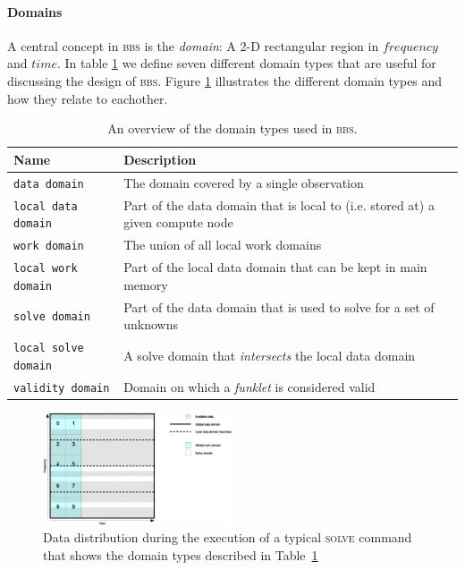 \documentclass[10pt]{lofar}
\newcommand{\bbs}{\textsc{bbs}\xspace}
\begin{document}
\paragraph{Domains}
A central concept in \bbs is the \emph{domain}: A 2-D rectangular region in
$frequency$ and $time$. In table \ref{tab:domains} we define seven different
domain types that are useful for discussing the design of \bbs. Figure
\ref{fig:domains} illustrates the different domain types and how they relate to
eachother.

\begin{table}[htb!]
\centering
\begin{tabular}{lp{}}
\hline
\textbf{Name} & \textbf{Description}\\
\hline
\texttt{data domain} & The domain covered by a single observation\\
\hline
\texttt{local data domain} & Part of the data domain that is local to (i.e.
stored at) a given compute node\\
\hline
\texttt{work domain} & The union of all local work domains\\
\hline
\texttt{local work domain} & Part of the local data domain that can be kept in
main memory\\
\hline
\texttt{solve domain} & Part of the data domain that is used to solve for a set
of unknowns\\
\hline
\texttt{local solve domain} & A solve domain that \emph{intersects} the local
data domain\\
\hline
\texttt{validity domain} & Domain on which a \emph{funklet} is considered
valid\\
\end{tabular}
\caption{An overview of the domain types used in \bbs.}
\label{tab:domains}
\end{table}

\begin{figure}[htbp]
\centering
\includegraphics[width=0.5\textwidth]{images/domains.eps}
\caption{Data distribution during the execution of a typical \textsc{solve}
command that shows the domain types described in Table~\ref{tab:domains}}
\label{fig:domains}
\end{figure}
\end{document}
